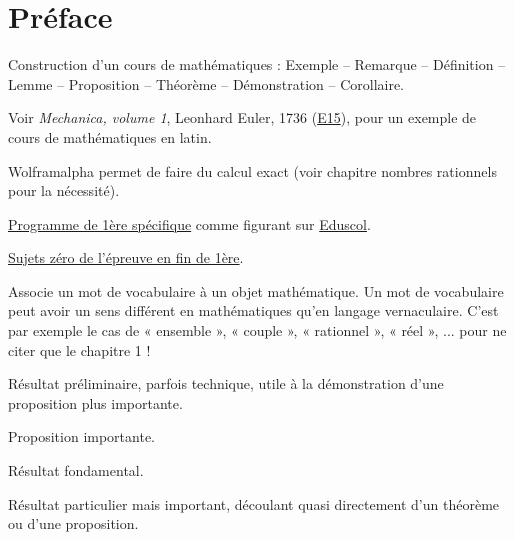 
\chapter*{Préface}

Construction d'un cours de mathématiques : Exemple -- Remarque -- Définition -- Lemme -- Proposition -- Théorème -- Démonstration -- Corollaire.

Voir \emph{Mechanica, volume 1}, Leonhard Euler, 1736 (\href{https://scholarlycommons.pacific.edu/euler-works/15/}{E15}), pour un exemple de cours de mathématiques en latin.

Wolframalpha permet de faire du calcul exact (voir chapitre nombres rationnels pour la nécessité).

\href{https://eduscol.education.fr/document/41635/download}{Programme de 1ère spécifique} comme figurant sur 
\href{https://eduscol.education.fr/1723/programmes-et-ressources-en-mathematiques-voie-gt}{Eduscol}.

\href{https://eduscol.education.fr/4230/epreuve-anticipee-de-mathematiques-aux-baccalaureats-general-et-technologique}{Sujets zéro de l'épreuve en fin de 1ère}.

\begin{definition*}
Associe un mot de vocabulaire à un objet mathématique.
Un mot de vocabulaire peut avoir un sens différent en mathématiques qu'en langage vernaculaire.
C'est par exemple le cas de « ensemble », « couple », « rationnel », « réel », ... pour ne citer que le chapitre 1 !
\end{definition*}

\begin{lemme*}
	Résultat préliminaire, parfois technique, utile à la démonstration d'une proposition plus importante.
\end{lemme*}

\begin{proposition*}
	Proposition importante.
\end{proposition*}

\begin{theorem*}
	Résultat fondamental.
\end{theorem*}

\begin{corollaire*}
	Résultat particulier mais important, découlant quasi directement d'un théorème ou d'une proposition.
\end{corollaire*}

